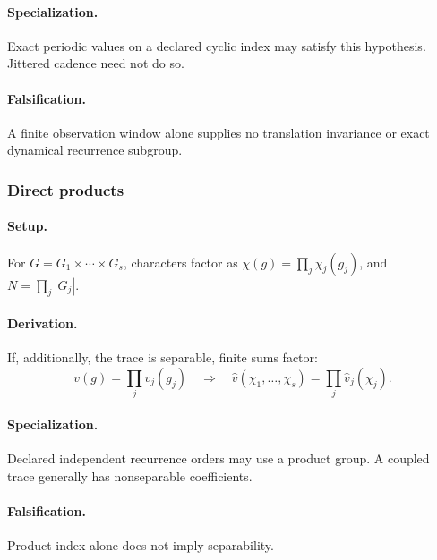 \paragraph{Specialization.} Exact periodic values on a declared cyclic
index may satisfy this hypothesis. Jittered cadence need not do so.
\paragraph{Falsification.} A finite observation window alone supplies no
translation invariance or exact dynamical recurrence subgroup.


\subsubsection{Direct products}
\paragraph{Setup.}
For \(G=G_1\times\cdots\times G_s\), characters factor as
\(\chi(g)=\prod_j\chi_j(g_j)\), and \(N=\prod_j|G_j|\).
\paragraph{Derivation.}
If, additionally, the trace is separable, finite sums factor:
\begin{equation}
v(g)=\prod_j v_j(g_j)
\quad\Longrightarrow\quad
\widehat v(\chi_1,\ldots,\chi_s)=\prod_j\widehat v_j(\chi_j).
\label{eq:fourier-product-factorization}
\end{equation}
\paragraph{Specialization.} Declared independent recurrence orders may use
a product group. A coupled trace generally has nonseparable coefficients.
\paragraph{Falsification.} Product index alone does not imply separability.

